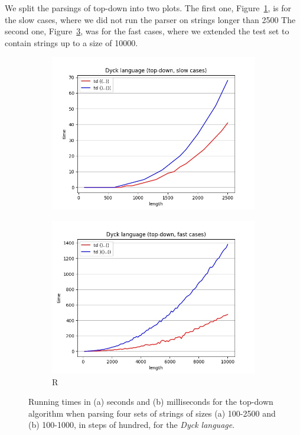 We split the parsings of top-down into two plots.
The first one, Figure~\ref{fig:t_dyck_td_slow}, is for the slow cases, where we did not run the parser on strings longer than 2500
The second one, Figure~\ref{fig:t_dyck_td_fast}, was for the fast cases, where we extended the test set to contain strings up to a size of 10000.

\begin{figure}[!ht]
    \centering
    \begin{subfigure}[b]{0.48\textwidth}
        \includegraphics[width=1.1\textwidth]{Resources/t_dyck_td_slow.jpg}
        \caption{}
        \label{fig:t_dyck_td_slow}
    \end{subfigure}
    \hfill
    \begin{subfigure}[b]{0.48\textwidth}
        \includegraphics[width=1.1\textwidth]{Resources/t_dyck_td_fast.jpg}
    \caption{R}
    \label{fig:t_dyck_td_fast}
    \end{subfigure}
    \caption{Running times in (a) seconds and (b) milliseconds for the top-down algorithm when parsing four sets of strings of sizes (a) 100-2500 and (b) 100-1000, in steps of hundred, for the \textit{Dyck language}.}
\end{figure}

